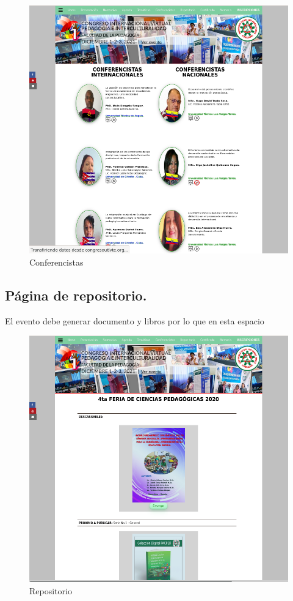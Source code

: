 \documentclass[a4paper,14px]{article}
\begin{document}
\begin{figure}[H]
  \centering
  \includegraphics[scale=0.6]{conferencistas.png}
  \caption{Conferencistas}
  \label{fig:arquitectura}
\end{figure}


\newpage
\subsection{Página de repositorio. }
\label{sec:pagina-principal}

El evento debe generar documento y libros por lo que en esta espacio





\begin{figure}[H]
  \centering
  \includegraphics[scale=0.6]{repositorio.png}
  \caption{Repositorio}
  \label{fig:arquitectura}
\end{figure}
\end{document}
